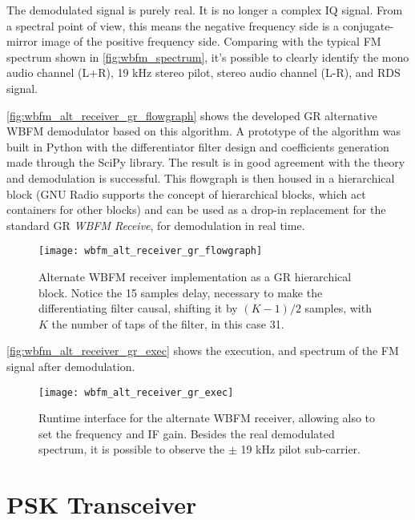 The demodulated signal is purely real. It is no longer a complex IQ signal. From a spectral point of view, this means the negative frequency side is a conjugate-mirror image of the positive frequency side. Comparing with the typical FM spectrum shown in \autoref{fig:wbfm_spectrum}, it's possible to clearly identify the mono audio channel (L+R), 19 kHz stereo pilot, stereo audio channel (L-R), and RDS signal.

\autoref{fig:wbfm_alt_receiver_gr_flowgraph} shows the developed GR alternative WBFM demodulator based on this algorithm. A prototype of the algorithm was built in Python with the differentiator filter design and coefficients generation made through the SciPy library. The result is in good agreement with the theory and demodulation is successful. This flowgraph is then housed in a hierarchical block (GNU Radio supports the concept of hierarchical blocks, which act containers for other blocks) and can be used as a drop-in replacement for the standard GR \emph{WBFM Receive}, for demodulation in real time.

\begin{figure}[H]
  \centering
  \texttt{[image: wbfm\_alt\_receiver\_gr\_flowgraph]}
  \caption[Alternate WBFM receiver implementation as a GR hierarchical block]{Alternate WBFM receiver implementation as a GR hierarchical block. Notice the 15 samples delay, necessary to make the differentiating filter causal, shifting it by $(K-1)/2$ samples, with $K$ the number of taps of the filter, in this case 31.}
  \label{fig:wbfm_alt_receiver_gr_flowgraph}
\end{figure}

\autoref{fig:wbfm_alt_receiver_gr_exec} shows the execution, and spectrum of the FM signal after demodulation.

\begin{figure}[H]
  \centering
  \texttt{[image: wbfm\_alt\_receiver\_gr\_exec]}
  \caption[Runtime interface for the alternate WBFM receiver]{Runtime interface for the alternate WBFM receiver, allowing also to set the frequency and IF gain. Besides the real demodulated spectrum, it is possible to observe the $\pm$ 19 kHz pilot sub-carrier.}
  \label{fig:wbfm_alt_receiver_gr_exec}
\end{figure}

\section{PSK Transceiver}
\label{sect:psk_transceiver}

